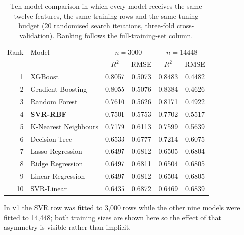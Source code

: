 \begin{table}[htbp]
\centering
\caption{Ten-model comparison in which every model receives the same twelve features, the same training rows and the same tuning budget (20 randomised search iterations, three-fold cross-validation). Ranking follows the full-training-set column.}\label{tab:models}
\small
\begin{tabular}{rlcccc}
\toprule
Rank & Model & \multicolumn{2}{c}{$n = 3000$} & \multicolumn{2}{c}{$n = 14448$} \\
 & & $R^2$ & RMSE & $R^2$ & RMSE \\
\midrule
1 & XGBoost & 0.8057 & 0.5073 & 0.8483 & 0.4482 \\
2 & Gradient Boosting & 0.8055 & 0.5076 & 0.8384 & 0.4626 \\
3 & Random Forest & 0.7610 & 0.5626 & 0.8171 & 0.4922 \\
4 & \textbf{SVR-RBF} & 0.7501 & 0.5753 & 0.7702 & 0.5517 \\
5 & K-Nearest Neighbours & 0.7179 & 0.6113 & 0.7599 & 0.5639 \\
6 & Decision Tree & 0.6533 & 0.6777 & 0.7214 & 0.6075 \\
7 & Lasso Regression & 0.6497 & 0.6812 & 0.6505 & 0.6804 \\
8 & Ridge Regression & 0.6497 & 0.6811 & 0.6504 & 0.6805 \\
9 & Linear Regression & 0.6497 & 0.6812 & 0.6504 & 0.6805 \\
10 & SVR-Linear & 0.6435 & 0.6872 & 0.6469 & 0.6839 \\
\bottomrule
\end{tabular}
\begin{flushleft}\footnotesize In v1 the SVR row was fitted to 3{,}000 rows while the other nine models were fitted to 14{,}448; both training sizes are shown here so the effect of that asymmetry is visible rather than implicit.\end{flushleft}
\end{table}
